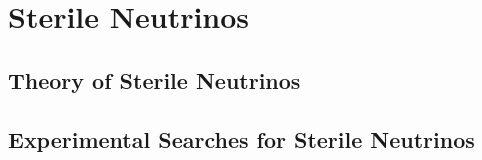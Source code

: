 \chapter{Sterile Neutrinos}

\section{Theory of Sterile Neutrinos}

\section{Experimental Searches for Sterile Neutrinos}

